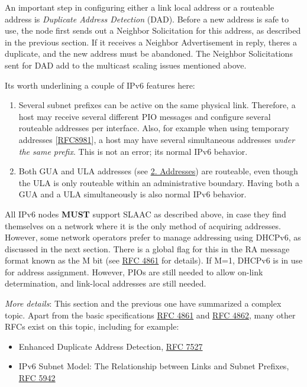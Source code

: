 \documentclass[
]{article}
\begin{document}
An important step in configuring either a link local address or a
routeable address is \emph{Duplicate Address Detection} (DAD). Before a
new address is safe to use, the node first sends out a Neighbor
Solicitation for this address, as described in the previous section. If
it receives a Neighbor Advertisement in reply, there\textquotesingle s a
duplicate, and the new address must be abandoned. The Neighbor
Solicitations sent for DAD add to the multicast scaling issues mentioned
above.

It\textquotesingle s worth underlining a couple of IPv6 features here:

\begin{enumerate}
\def\labelenumi{\arabic{enumi}.}
\item
  Several subnet prefixes can be active on the same physical link.
  Therefore, a host may receive several different PIO messages and
  configure several routeable addresses per interface. Also, for example
  when using temporary addresses
  {[}\href{https://www.rfc-editor.org/info/rfc8981}{RFC8981}{]}, a host
  may have several simultaneous addresses \emph{under the same prefix}.
  This is not an error; it\textquotesingle s normal IPv6 behavior.
\item
  Both GUA and ULA addresses (see \hyperref[addresses]{2. Addresses})
  are routeable, even though the ULA is only routeable within an
  administrative boundary. Having both a GUA and a ULA simultaneously is
  also normal IPv6 behavior.
\end{enumerate}

All IPv6 nodes \textbf{MUST} support SLAAC as described above, in case
they find themselves on a network where it is the only method of
acquiring addresses. However, some network operators prefer to manage
addressing using DHCPv6, as discussed in the next section. There is a
global flag for this in the RA message format known as the M bit (see
\href{https://www.rfc-editor.org/info/rfc4861}{RFC 4861} for details).
If M=1, DHCPv6 is in use for address assignment. However, PIOs are still
needed to allow on-link determination, and link-local addresses are
still needed.

\emph{More details}: This section and the previous one have summarized a
complex topic. Apart from the basic specifications
\href{https://www.rfc-editor.org/info/rfc4861}{RFC 4861} and
\href{https://www.rfc-editor.org/info/rfc4862}{RFC 4862}, many other
RFCs exist on this topic, including for example:

\begin{itemize}
\item
  Enhanced Duplicate Address Detection,
  \href{https://www.rfc-editor.org/info/rfc7527}{RFC 7527}
\item
  IPv6 Subnet Model: The Relationship between Links and Subnet Prefixes,
  \href{https://www.rfc-editor.org/info/rfc5942}{RFC 5942}
\end{itemize}
\end{document}
